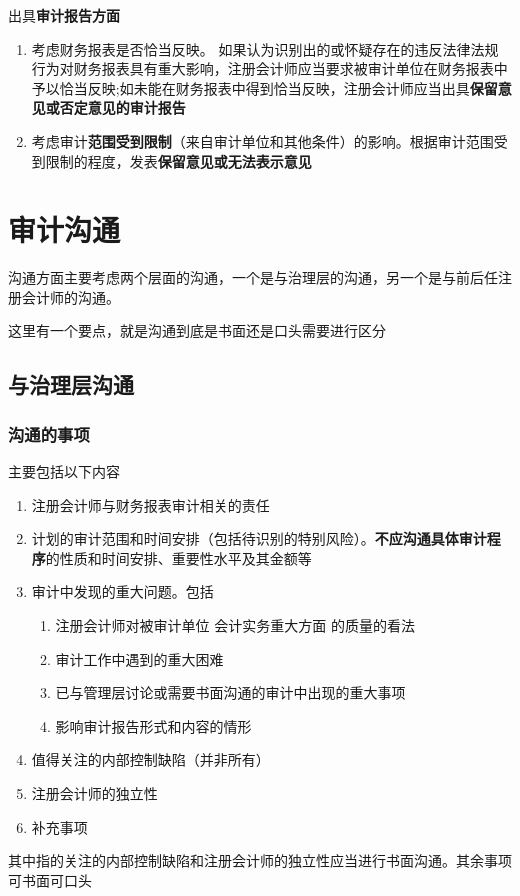 \documentclass[UTF8,12pt]{ctexart}
\numberwithin{equation}{section} %
\numberwithin{figure}{section}
\numberwithin{table}{section}
\begin{document}
	出具\textbf{审计报告方面}
	\begin{enumerate}
		\item 考虑财务报表是否恰当反映。 如果认为识别出的或怀疑存在的违反法律法规行为对财务报表具有重大影响，注册会计师应当要求被审计单位在财务报表中予以恰当反映;如未能在财务报表中得到恰当反映，注册会计师应当出具\textbf{保留意见或否定意见的审计报告}
		
		\item 考虑审计\textbf{范围受到限制}（来自审计单位和其他条件）的影响。根据审计范围受到限制的程度，发表\textbf{保留意见或无法表示意见}
	\end{enumerate}
	
	
	\newpage
	\section{审计沟通}
	沟通方面主要考虑两个层面的沟通，一个是与治理层的沟通，另一个是与前后任注册会计师的沟通。
	
	这里有一个要点，就是沟通到底是书面还是口头需要进行区分
	
	\subsection{与治理层沟通}
	
	\subsubsection{沟通的事项}
	主要包括以下内容
	\begin{enumerate}
		\item 注册会计师与财务报表审计相关的责任
		
		\item 计划的审计范围和时间安排（包括待识别的特别风险）。\textbf{不应沟通具体审计程序}的性质和时间安排、重要性水平及其金额等
		
		
		\item 审计中发现的重大问题。包括
		\begin{enumerate}
			\item 注册会计师对被审计单位  会计实务重大方面  的质量的看法
			
			\item 审计工作中遇到的重大困难
			
			
			\item 已与管理层讨论或需要书面沟通的审计中出现的重大事项
			
			\item 影响审计报告形式和内容的情形
		\end{enumerate}
		
		
		\item 值得关注的内部控制缺陷（并非所有）
		
		
		\item 注册会计师的独立性
		
		\item 补充事项
	\end{enumerate}
	其中指的关注的内部控制缺陷和注册会计师的独立性应当进行书面沟通。其余事项可书面可口头
	
\end{document}
